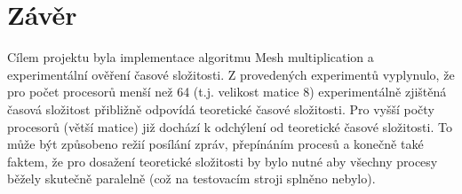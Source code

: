 \documentclass[a4paper,12pt]{article}
\begin{document}
% 

\section{Závěr}
Cílem projektu byla implementace algoritmu Mesh multiplication a experimentální ověření časové složitosti. Z 
provedených experimentů vyplynulo, že pro počet procesorů menší než 64 (t.j. velikost matice 8) experimentálně zjištěná 
časová složitost přibližně odpovídá teoretické časové složitosti. Pro vyšší počty procesorů (větší matice) již dochází k odchýlení od 
teoretické časové složitosti. To může být způsobeno režií posílání zpráv, přepínáním procesů a konečně také faktem,
že pro dosažení teoretické složitosti by bylo nutné aby všechny procesy běžely skutečně paralelně (což na testovacím
stroji splněno nebylo).
\end{document}
